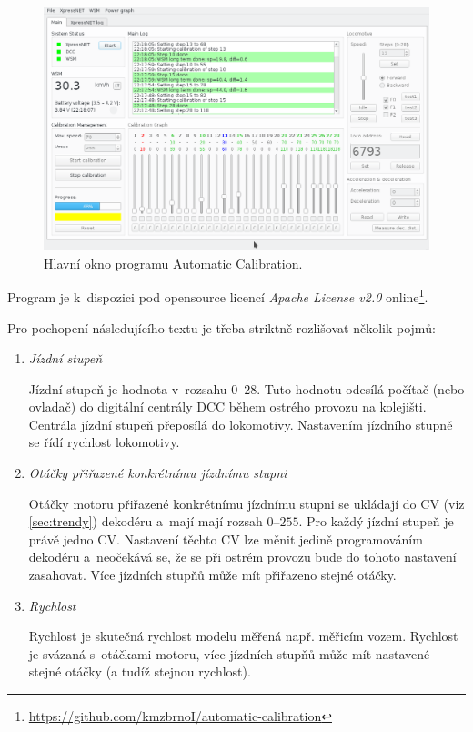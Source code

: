 \begin{figure}[ht]
\includegraphics[width=\textwidth]{data/ac_progress.png}
\caption{Hlavní okno programu Automatic Calibration.}
\label{fig:ac-gui}
\end{figure}

Program je k~dispozici pod opensource licencí \textit{Apache License v2.0}
online\footnote{\url{https://github.com/kmzbrnoI/automatic-calibration}}.

Pro pochopení následujícího textu je třeba striktně rozlišovat několik pojmů:

\begin{enumerate}
\item \textit{Jízdní stupeň}

Jízdní stupeň je hodnota v~rozsahu $0$--$28$. Tuto hodnotu odesílá počítač
(nebo ovladač) do digitální centrály \gls{DCC} během ostrého provozu na kolejišti.
Centrála jízdní stupeň přeposílá do lokomotivy. Nastavením jízdního stupně
se řídí rychlost lokomotivy.

\item \textit{Otáčky přiřazené konkrétnímu jízdnímu stupni}

Otáčky motoru přiřazené konkrétnímu jízdnímu stupni se ukládají do \gls{CV}
(viz \ref{sec:trendy}) dekodéru a~mají mají rozsah $0$--$255$. Pro každý jízdní
stupeň je právě jedno \gls{CV}. Nastavení těchto \gls{CV} lze měnit jedině
programováním dekodéru a~neočekává se, že se při ostrém provozu bude do tohoto
nastavení zasahovat. Více jízdních stupňů může mít přiřazeno stejné otáčky.

\item \textit{Rychlost}

Rychlost je skutečná rychlost modelu měřená např. měřicím vozem. Rychlost
je svázaná s~otáčkami motoru, více jízdních stupňů může mít nastavené
stejné otáčky (a tudíž stejnou rychlost).

\end{enumerate}


